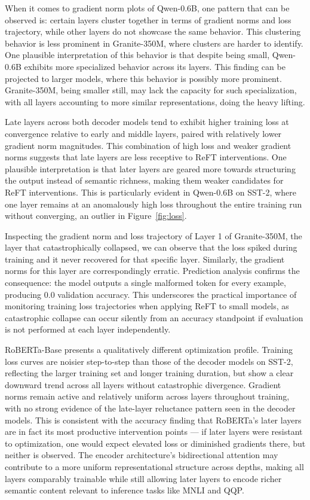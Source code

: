 \documentclass[conference]{IEEEtran}
\begin{document}
	When it comes to gradient norm plots of Qwen-0.6B, one pattern that can be observed is: certain layers cluster together in terms of gradient norms and loss trajectory, while other layers do not showcase the same behavior. This clustering behavior is less prominent in Granite-350M, where clusters are harder to identify. One plausible interpretation of this behavior is that despite being small, Qwen-0.6B exhibits more specialized behavior across its layers. This finding can be projected to larger models, where this behavior is possibly more prominent. Granite-350M, being smaller still, may lack the capacity for such specialization, with all layers accounting to more similar representations, doing the heavy lifting.
	
	Late layers across both decoder models tend to exhibit higher training loss at convergence relative to early and middle layers, paired with relatively lower gradient norm magnitudes. This combination of high loss and weaker gradient norms suggests that late layers are less receptive to ReFT interventions. One plausible interpretation is that later layers are geared more towards structuring the output instead of semantic richness, making them weaker candidates for ReFT interventions. This is particularly evident in Qwen-0.6B on SST-2, where one layer remains at an anomalously high loss throughout the entire training run without converging, an outlier in Figure~\ref{fig:loss}.
	
	\label{sec:loss_2}
	Inspecting the gradient norm and loss trajectory of Layer 1 of Granite-350M, the layer that catastrophically collapsed, we can observe that the loss spiked during training and it never recovered for that specific layer. Similarly, the gradient norms for this layer are correspondingly erratic. Prediction analysis confirms the consequence: the model outputs a single malformed token for every example, producing 0.0 validation accuracy. This underscores the practical importance of monitoring training loss trajectories when applying ReFT to small models, as catastrophic collapse can occur silently from an accuracy standpoint if evaluation is not performed at each layer independently.
	
	RoBERTa-Base presents a qualitatively different optimization profile. Training loss curves are noisier step-to-step than those of the decoder models on SST-2, reflecting the larger training set and longer training duration, but show a clear downward trend across all layers without catastrophic divergence. Gradient norms remain active and relatively uniform across layers throughout training, with no strong evidence of the late-layer reluctance pattern seen in the decoder models. This is consistent with the accuracy finding that RoBERTa's later layers are in fact its most productive intervention points — if later layers were resistant to optimization, one would expect elevated loss or diminished gradients there, but neither is observed. The encoder architecture's bidirectional attention may contribute to a more uniform representational structure across depths, making all layers comparably trainable while still allowing later layers to encode richer semantic content relevant to inference tasks like MNLI and QQP.
	
\end{document}
